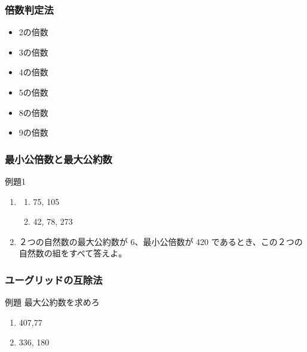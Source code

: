 \documentclass[10pt,dvipdfmx]{jsarticle}
\begin{document}
\subsubsection*{倍数判定法}
\begin{multicols}{2}
  \begin{itemize}
    \item 2の倍数
    \item 3の倍数
    \item 4の倍数
    \item 5の倍数
    \item 8の倍数
    \item 9の倍数
  \end{itemize}
\end{multicols}

\subsubsection*{最小公倍数と最大公約数}
\begin{itembox}[l]{例題1}
  \begin{enumerate}
    \item \begin{multicols}{2}
            \begin{large}
              \begin{enumerate}
                \item 75, 105
                \item 42, 78, 273
              \end{enumerate}
            \end{large}
          \end{multicols}
    \item
          ２つの自然数の最大公約数が 6、最小公倍数が 420 であるとき、この２つの自然数の組をすべて答えよ。
  \end{enumerate}
  \vspace{10mm}
\end{itembox}

\subsubsection*{ユーグリッドの互除法}
\begin{itembox}[l]{例題 最大公約数を求めろ}
  \begin{large}
    \begin{enumerate}
      \item 407,77
      \item 336, 180
    \end{enumerate}
  \end{large}
\end{itembox}
\end{document}

